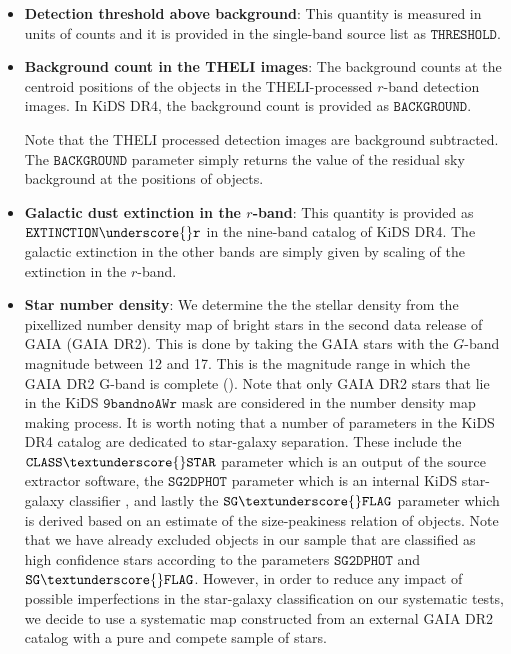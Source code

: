 \documentclass[fleqn,usenatbib,useAMS]{mnras}
\begin{document}
\begin{itemize}
  \item \textbf{Detection threshold above background}: This quantity is measured in units of counts and it is provided in the single-band source list as $\mathtt{THRESHOLD}$. 
  
  \item \textbf{Background count in the THELI images}: The background counts at the centroid positions of the objects in the THELI-processed $r$-band detection images. In KiDS DR4, the background count is provided as $\mathtt{BACKGROUND}$.  
  
  Note that the THELI processed detection images are background subtracted. The $\mathtt{BACKGROUND}$ parameter simply returns the value of the residual sky background at the positions of 
  objects.
  \item \textbf{Galactic dust extinction in the $r$-band}: This quantity is provided as $\mathtt{EXTINCTION\underscore{}r}$ in the nine-band catalog of KiDS DR4. The galactic extinction in the other bands are simply given by scaling of the extinction in the $r$-band.   
  \item \textbf{Star number density}: We determine the the stellar density from the pixellized number density map of bright stars in the second data release of GAIA (GAIA DR2). This is done by taking the GAIA stars with the $G$-band magnitude between 12 and 17. This is the magnitude range in which the GAIA DR2 G-band is complete (\citealt{gaia0,gaia1}). Note that only GAIA DR2 stars that lie in the KiDS $\mathtt{9bandnoAWr}$ mask are considered in the number density map making process. It is worth noting that a number of parameters in the KiDS DR4 catalog are dedicated to star-galaxy separation. These include the $\mathtt{CLASS\textunderscore{}STAR}$
 parameter which is an output of the source extractor software, the $\mathtt{SG2DPHOT}$ parameter which is an internal KiDS star-galaxy classifier \citep[e.g.][]{kids_dr3, radovich2017}, and lastly the $\mathtt{SG\textunderscore{}FLAG}$ parameter which is derived based on an estimate of the size-peakiness relation of objects. Note that we have already excluded objects in our sample that are classified as high confidence stars according to the parameters $\mathtt{SG2DPHOT}$ and $\mathtt{SG\textunderscore{} FLAG}$. However, in order to reduce any impact of possible imperfections in the star-galaxy classification on our systematic tests, we decide to use a systematic map constructed from an external GAIA DR2 catalog with a pure and compete sample of stars. 
 
\end{itemize}
\end{document}
